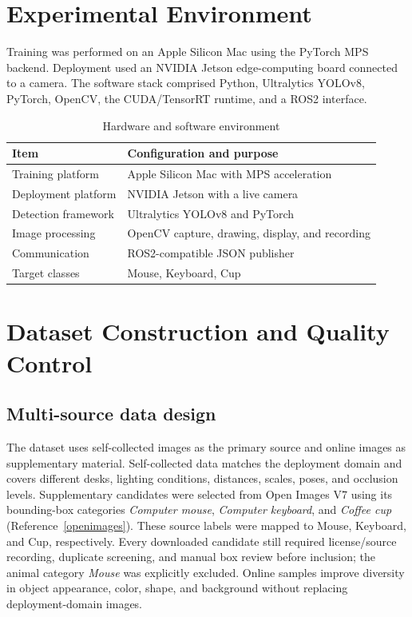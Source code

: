 \documentclass[a4paper,11pt]{article}
\begin{document}
\section{Experimental Environment}
Training was performed on an Apple Silicon Mac using the PyTorch MPS backend. Deployment used an NVIDIA Jetson edge-computing board connected to a camera. The software stack comprised Python, Ultralytics YOLOv8, PyTorch, OpenCV, the CUDA/TensorRT runtime, and a ROS2 interface.

\begin{table}[htbp]\centering\caption{Hardware and software environment}
\begin{tabular}{ll}\toprule \textbf{Item} & \textbf{Configuration and purpose}\\\midrule
Training platform & Apple Silicon Mac with MPS acceleration\\
Deployment platform & NVIDIA Jetson with a live camera\\
Detection framework & Ultralytics YOLOv8 and PyTorch\\
Image processing & OpenCV capture, drawing, display, and recording\\
Communication & ROS2-compatible JSON publisher\\
Target classes & Mouse, Keyboard, Cup\\\bottomrule\end{tabular}\end{table}

\section{Dataset Construction and Quality Control}
\subsection{Multi-source data design}
The dataset uses self-collected images as the primary source and online images as supplementary material. Self-collected data matches the deployment domain and covers different desks, lighting conditions, distances, scales, poses, and occlusion levels. Supplementary candidates were selected from Open Images V7 using its bounding-box categories \emph{Computer mouse}, \emph{Computer keyboard}, and \emph{Coffee cup} (Reference~\ref{openimages}). These source labels were mapped to Mouse, Keyboard, and Cup, respectively. Every downloaded candidate still required license/source recording, duplicate screening, and manual box review before inclusion; the animal category \emph{Mouse} was explicitly excluded. Online samples improve diversity in object appearance, color, shape, and background without replacing deployment-domain images.
\end{document}
